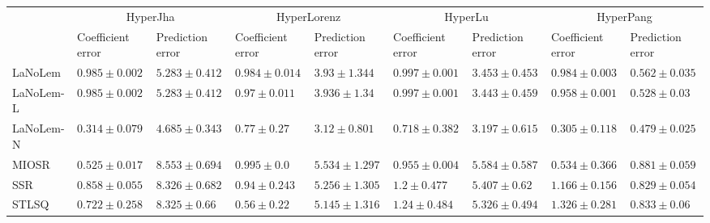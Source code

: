 \begin{table*}
{\begin{tabular}{lllllllll}
 & \multicolumn{2}{c}{HyperJha} & \multicolumn{2}{c}{HyperLorenz} & \multicolumn{2}{c}{HyperLu} & \multicolumn{2}{c}{HyperPang} \\
 & Coefficient error & Prediction error & Coefficient error & Prediction error & Coefficient error & Prediction error & Coefficient error & Prediction error \\
\midrule
LaNoLem & $0.985\pm 0.002$ & $5.283\pm 0.412$ & $0.984\pm 0.014$ & $3.93\pm 1.344$ & $0.997\pm 0.001$ & $3.453\pm 0.453$ & $0.984\pm 0.003$ & $0.562\pm 0.035$ \\
LaNoLem-L & $0.985\pm 0.002$ & $5.283\pm 0.412$ & $0.97\pm 0.011$ & $3.936\pm 1.34$ & $0.997\pm 0.001$ & $3.443\pm 0.459$ & $0.958\pm 0.001$ & $0.528\pm 0.03$ \\
LaNoLem-N & $\mathbf{0.314}\pm 0.079$ & $\mathbf{4.685}\pm 0.343$ & $0.77\pm 0.27$ & $\mathbf{3.12}\pm 0.801$ & $\mathbf{0.718}\pm 0.382$ & $\mathbf{3.197}\pm 0.615$ & $\mathbf{0.305}\pm 0.118$ & $\mathbf{0.479}\pm 0.025$ \\
MIOSR & $0.525\pm 0.017$ & $8.553\pm 0.694$ & $0.995\pm 0.0$ & $5.534\pm 1.297$ & $0.955\pm 0.004$ & $5.584\pm 0.587$ & $0.534\pm 0.366$ & $0.881\pm 0.059$ \\
SSR & $0.858\pm 0.055$ & $8.326\pm 0.682$ & $0.94\pm 0.243$ & $5.256\pm 1.305$ & $1.2\pm 0.477$ & $5.407\pm 0.62$ & $1.166\pm 0.156$ & $0.829\pm 0.054$ \\
STLSQ & $0.722\pm 0.258$ & $8.325\pm 0.66$ & $\mathbf{0.56}\pm 0.22$ & $5.145\pm 1.316$ & $1.24\pm 0.484$ & $5.326\pm 0.494$ & $1.326\pm 0.281$ & $0.833\pm 0.06$ \\

\midrule


\end{tabular}}
\end{table*}
